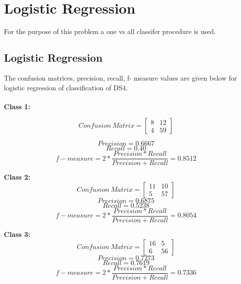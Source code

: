 \documentclass[12pt]{article}
\begin{document}
\section{Logistic Regression}

For the purpose of this problem a one vs all classifer procedure is used. 
\subsection{Logistic Regression}

The confusion matrices, precision, recall, f- measure values are given below for logistic regression of classification of DS4.\\
\\
\textbf{Class 1:}

\begin{equation} 
Confusion\ Matrix = \begin{bmatrix} 8  & 12 \\ 4 & 59 \end{bmatrix}
\end{equation}

\begin{equation}
Precision = 0.6667
\end{equation}
\begin{equation}
Recall = 0.40
\end{equation}
\begin{equation}
f-measure = 2*\frac{Precision*Recall}{Precision + Recall} = 0.8512
\end{equation}


\textbf{Class 2:}
\begin{equation}
Confusion\ Matrix = \begin{bmatrix} 11  & 10 \\ 5 & 57 \end{bmatrix}
\end{equation}
\begin{equation}
Precision = 0.6875
\end{equation}
\begin{equation}
Recall = 0.5238
\end{equation}
\begin{equation}
f-measure = 2*\frac{Precision*Recall}{Precision + Recall} = 0.8054
\end{equation}


\textbf{Class 3:}
\begin{equation}
Confusion\ Matrix = \begin{bmatrix} 16 & 5 \\ 6 & 56 \end{bmatrix}
\end{equation}
\begin{equation}
Precision = 0.7273
\end{equation}
\begin{equation}
Recall = 0.7619
\end{equation}
\begin{equation}
f-measure = 2*\frac{Precision*Recall}{Precision + Recall} = 0.7336
\end{equation}
\end{document}
